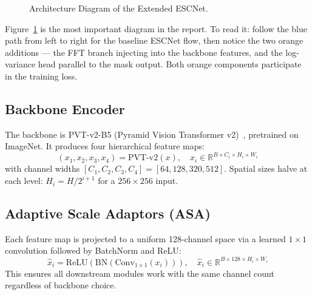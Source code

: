 \documentclass[12pt,a4paper]{report}
\begin{document}
\begin{figure}[H]
\caption{Architecture Diagram of the Extended ESCNet.}\label{fig:architecture}
\end{figure}

\noindent Figure~\ref{fig:architecture} is the most important diagram in the report. To read it: follow the blue path from left to right for the baseline ESCNet flow, then notice the two orange additions — the FFT branch injecting into the backbone features, and the log-variance head parallel to the mask output. Both orange components participate in the training loss.

\subsection{Backbone Encoder}

The backbone is PVT-v2-B5 (Pyramid Vision Transformer v2)~\cite{pvtv2}, pretrained on ImageNet. It produces four hierarchical feature maps:
\begin{equation}
  (x_1, x_2, x_3, x_4) = \text{PVT-v2}(x), \quad
  x_i \in \mathbb{R}^{B \times C_i \times H_i \times W_i}
  \label{eq:backbone}
\end{equation}
with channel widths $[C_1, C_2, C_3, C_4] = [64, 128, 320, 512]$. Spatial sizes halve at each level: $H_i = H / 2^{i+1}$ for a $256 \times 256$ input.

\subsection{Adaptive Scale Adaptors (ASA)}

Each feature map is projected to a uniform 128-channel space via a learned $1\times1$ convolution followed by BatchNorm and ReLU:
\begin{equation}
  \hat{x}_i = \text{ReLU}\!\left(\text{BN}\!\left(\text{Conv}_{1\times1}(x_i)\right)\right),\quad
  \hat{x}_i\in\mathbb{R}^{B\times128\times H_i\times W_i}
  \label{eq:asa}
\end{equation}
This ensures all downstream modules work with the same channel count regardless of backbone choice.
\end{document}
